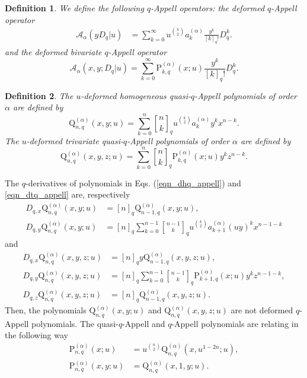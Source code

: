 \documentclass[12pt]{article}
\newcommand{\qbinom}{\genfrac{[}{]}{0pt}{}}
\newcommand{\p}{\mathrm{P}}
\newcommand{\q}{\mathrm{Q}}
\newcommand{\Aa}{\mathscr{A}}
\newtheorem{definition}{Definition}
\begin{document}
\begin{definition}
We define the following $q$-Appell operators: the deformed $q$-Appell operator
    \begin{align}
        \Aa_{\alpha}(yD_{q}|u)&=\sum_{k=0}^{\infty}u^{\binom{k}{2}}a_{k}^{(\alpha)}\frac{y^{k}}{[k]_{q}!}D_{q}^{k}.
    \end{align}
and the deformed bivariate $q$-Appell operator
\begin{equation}
    \Aa_{\alpha}(x,y;D_{q}|u)=\sum_{k=0}^{\infty}\p_{k,q}^{(\alpha)}(x;u)\frac{y^{k}}{[k]_{q}!}D_{q}^{k}.
\end{equation}
\end{definition}

\begin{definition}
The $u$-deformed homogeneous quasi-$q$-Appell polynomials of order $\alpha$ are defined by
    \begin{equation}\label{eqn_dhq_appell}
        \q_{n,q}^{(\alpha)}(x,y;u)=\sum_{k=0}^{n}\qbinom{n}{k}_{q}u^{\binom{k}{2}}a_{k}^{(\alpha)}y^{k}x^{n-k}.
    \end{equation}
The $u$-deformed trivariate quasi-$q$-Appell polynomials of order $\alpha$ are defined by
    \begin{equation}\label{eqn_dtq_appell}
        \q_{n,q}^{(\alpha)}(x,y,z;u)=\sum_{k=0}^{n}\qbinom{n}{k}_{q}\p_{k,q}^{(\alpha)}(x;u)y^{k}z^{n-k}.
    \end{equation}
\end{definition}
The $q$-derivatives of polynomials in Eqs. (\ref{eqn_dhq_appell}) and \ref{eqn_dtq_appell} are, respectively
\begin{align*}
    D_{q,x}\q_{n,q}^{(\alpha)}(x,y;u)&=[n]_{q}\q_{n-1,q}^{(\alpha)}(x,y;u),\\
    D_{q,y}\q_{n,q}^{(\alpha)}(x,y;u)&=[n]_{q}\sum_{k=0}^{n-1}\qbinom{n-1}{k}_{q}u^{\binom{k}{2}}a_{k+1}^{(\alpha)}(uy)^{k}x^{n-1-k}
\end{align*}
and
\begin{align*}
    D_{q,x}\q_{n,q}^{(\alpha)}(x,y,z;u)&=[n]_{q}y\q_{n-1,q}^{(\alpha)}(x,y,z;u),\\
    D_{q,y}\q_{n,q}^{(\alpha)}(x,y,z;u)&=[n]_{q}\sum_{k=0}^{n-1}\qbinom{n-1}{k}_{q}\p_{k+1,q}^{(\alpha)}(x;u)y^{k}z^{n-1-k},\\
    D_{q,z}\q_{n,q}^{(\alpha)}(x,y,z;u)&=[n]_{q}\q_{n-1,q}^{(\alpha)}(x,y,z;u).
\end{align*}
Then, the polynomials $\q_{n,q}^{(\alpha)}(x,y;u)$ and $\q_{n,q}^{(\alpha)}(x,y,z;u)$ are not deformed $q$-Appell polynomials. The quasi-$q$-Appell and $q$-Appell polynomials are relating in the following way
\begin{align}
    \p_{n,q}^{(\alpha)}(x;u)&=u^{\binom{n}{2}}\q_{n,q}^{(\alpha)}(x,u^{1-2n};u),\\
    \p_{n,q}^{(\alpha)}(x,y;u)&=\q_{n,q}^{(\alpha)}(x,1,y;u).
\end{align}
\end{document}
